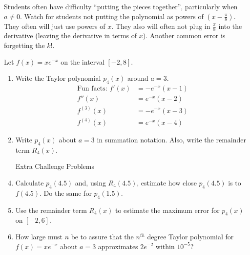 \documentclass[handout]{ximera}
\begin{document}
\begin{instructorNotes}
Students often have difficulty ``putting the pieces together'', particularly when $a \neq 0$.  
Watch for students not putting the polynomial as powers of $\left(x - \frac{\pi}{8} \right)$.  
They often will just use powers of $x$.  
They also will often not plug in $\frac{\pi}{8}$ into the derivative (leaving the derivative in terms of $x$).  
Another common error is forgetting the $k!$.  
\end{instructorNotes}







\begin{problem}
Let $f(x) = xe^{-x}$ on the interval $[-2,8]$.  
	\begin{enumerate}
	
	\item  Write the Taylor polynomial $p_4(x)$ around $a=3$.
		\begin{align*}
		\text{Fun facts: } f'(x) &= -e^{-x}(x-1)  \\
		f''(x) &= e^{-x} (x-2) \\
		f^{(3)}(x) &= -e^{-x} (x-3) \\
		f^{(4)}(x) &= e^{-x} (x-4) 
		\end{align*}
	
	\item  Write $p_4(x)$ about $a=3$ in summation notation.  
	Also, write the remainder term $R_4(x)$.  \\	
	
	\item[Extra Challenge Problems] 
	
	\item Calculate $p_4(4.5)$ and, using $R_4(4.5)$, estimate how close $p_4(4.5)$ is to $f(4.5)$.  
	Do the same for $p_4(1.5)$.  
	
	\item  Use the remainder term $R_4(x)$ to estimate the maximum error for $p_4(x)$ on $[-2,6]$.
	
	\item  How large must $n$ be to assure that the $n^{th}$ degree Taylor polynomial for $f(x) = xe^{-x}$ about $a=3$ approximates $2e^{-2}$ within $10^{-5}$?
	
	\end{enumerate}
	
	\begin{freeResponse}
	\begin{enumerate}
	

\end{enumerate}
\end{freeResponse}
\end{problem}
\end{document}
